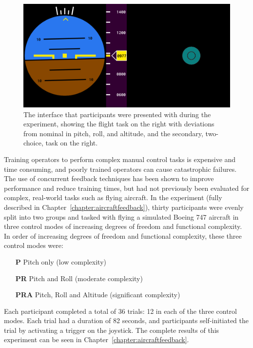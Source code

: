 \begin{figure}[b]
    \centering
    \includegraphics[width=0.8\linewidth]{figures/Aircraft/image1.png}
    \caption[The interface]{The interface that participants were presented with during the experiment, showing the flight task on the right with deviations from nominal in pitch, roll, and altitude, and the secondary, two-choice, task on the right.}
    \label{fig:display}
\end{figure}

Training operators to perform complex manual control tasks is expensive and time consuming, and poorly trained operators can cause catastrophic failures.
The use of concurrent feedback techniques has been shown to improve performance and reduce training times, but had not previously been evaluated for complex, real-world tasks such as flying aircraft.
In the experiment (fully described in Chapter~\ref{chapter:aircraftfeedback}), thirty participants were evenly split into two groups and tasked with flying a simulated Boeing 747 aircraft in three control modes of increasing degrees of freedom and functional complexity.
In order of increasing degrees of freedom and functional complexity, these three control modes were:
\begin{itemize}
    \item[\textbf{P}] Pitch only (low complexity)
    \item[\textbf{PR}] Pitch and Roll (moderate complexity)
    \item[\textbf{PRA}] Pitch, Roll and Altitude (significant complexity)
\end{itemize}

Each participant completed a total of 36 trials: 12 in each of the three control modes.
Each trial had a duration of 82 seconds, and participants self-initiated the trial by activating a trigger on the joystick.
The complete results of this experiment can be seen in Chapter~\ref{chapter:aircraftfeedback}.

